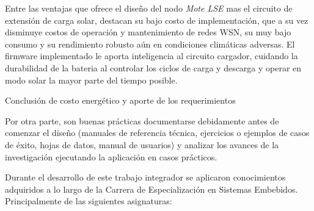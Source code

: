 Entre las ventajas que ofrece el diseño del nodo \textit{Mote LSE} mas el circuito de extensión de carga solar, destacan su bajo costo de implementación, que a su vez disminuye costos de operación y mantenimiento de redes WSN, su muy bajo consumo y su rendimiento robusto aún en condiciones climáticas adversas. El firmware implementado le aporta inteligencia al circuito cargador, cuidando la durabilidad de la bateria al controlar los ciclos de carga y descarga y operar en modo solar la mayor parte del tiempo posible.


Conclusión de costo energético y aporte de los requerimientos

Por otra parte, son buenas prácticas documentarse debidamente antes de comenzar el diseño (manuales de referencia técnica, ejercicios o ejemplos de casos de éxito, hojas de datos, manual de usuarios) y analizar los avances de la investigación ejecutando la aplicación en casos prácticos.

\medskip
Durante el desarrollo de este trabajo integrador se aplicaron conocimientos adquiridos a lo largo de la Carrera de Especialización en Sistemas Embebidos. Principalmente de las siguientes asignaturas: 


